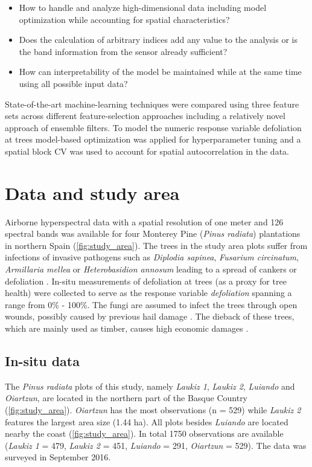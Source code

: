\documentclass[review]{elsarticle}
\begin{document}
\begin{itemize}
	\item How to handle and analyze high-dimensional data including model optimization while accounting for spatial characteristics?
	\item Does the calculation of arbitrary indices add any value to the analysis or is the band information from the sensor already sufficient?
	\item How can interpretability of the model be maintained while at the same time using all possible input data?
\end{itemize}

\noindent State-of-the-art machine-learning techniques were compared using three feature sets across different feature-selection approaches including a relatively novel approach of ensemble filters.
To model the numeric response variable defoliation at trees model-based optimization was applied for hyperparameter tuning and a spatial block \ac{CV} was used to account for spatial autocorrelation in the data.

\section{Data and study area}
\noindent Airborne hyperspectral data with a spatial resolution of one meter and 126 spectral bands was available for four Monterey Pine (\textit{Pinus radiata}) plantations in northern Spain (\autoref{fig:study_area}).
The trees in the study area plots suffer from infections of invasive pathogens such as \textit{Diplodia sapinea}, \textit{Fusarium circinatum}, \textit{Armillaria mellea} or \textit{Heterobasidion annosum} leading to a spread of cankers or defoliation \citep{mesanza2016, iturritxa2017}.
In-situ measurements of defoliation at trees (as a proxy for tree health) were collected to serve as the response variable \textit{defoliation} spanning a range from 0\% - 100\%.
The fungi are assumed to infect the trees through open wounds, possibly caused by previous hail damage \citep{iturritxa2014}.
The dieback of these trees, which are mainly used as timber, causes high economic damages \citep{ganley2009}.

\subsection{In-situ data}

\noindent The \textit{Pinus radiata} plots of this study, namely \textit{Laukiz 1}, \textit{Laukiz 2}, \textit{Luiando} and \textit{Oiartzun}, are located in the northern part of the Basque Country (\autoref{fig:study_area}).
\textit{Oiartzun} has the most observations (n = 529) while \textit{Laukiz 2} features the largest area size (1.44 ha).
All plots besides \textit{Luiando} are located nearby the coast (\autoref{fig:study_area}).
In total 1750 observations are available (\textit{Laukiz 1} = 479, \textit{Laukiz 2} = 451, \textit{Luiando} = 291, \textit{Oiartzun} = 529).
The data was surveyed in September 2016.
\end{document}
